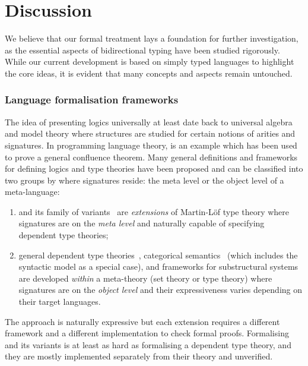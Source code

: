 
\section{Discussion} \label{sec:future}
We believe that our formal treatment lays a foundation for further investigation, as the essential aspects of bidirectional typing have been studied rigorously. 
While our current development is based on simply typed languages to highlight the core ideas, it is evident that many concepts and aspects remain untouched.
\subsubsection{Language formalisation frameworks}

The idea of presenting logics universally at least date back to universal algebra and model theory where structures are studied for certain notions of arities and signatures.
In programming language theory,  is an example which has been used to prove a general confluence theorem.
Many general definitions and frameworks for defining logics and type theories have been proposed and can be classified into two groups by where signatures reside: the meta level or the object level of a meta-language:
\begin{enumerate}
  \item {} and its family of variants~\cite{Harper2007,Assaf2016,Felicissimo2023} are \emph{extensions} of Martin-L\"of type theory where signatures are on the \emph{meta level} and naturally capable of specifying dependent type theories;
\item general dependent type theories~\cite{Bauer2020,Haselwarter2021,Bauer2022a,Uemura2021}, categorical semantics~\cite{Fiore1999,Tanaka2006,Tanaka2006a,Fiore2010,Hamana2011,Fiore2013,Arkor2020,Fiore2022} (which includes the syntactic model as a special case), and frameworks for substructural systems~\cite{Tanaka2006,Tanaka2006a,Wood2022} are developed \emph{within} a meta-theory (set theory or type theory) where signatures are on the \emph{object level} and their expressiveness varies depending on their target languages.
\end{enumerate}

The \LF approach is naturally expressive but each extension requires a different framework and a different implementation to check formal \LF proofs.
Formalising \LF and its variants is at least as hard as formalising a dependent type theory, and they are mostly implemented separately from their theory and unverified.

